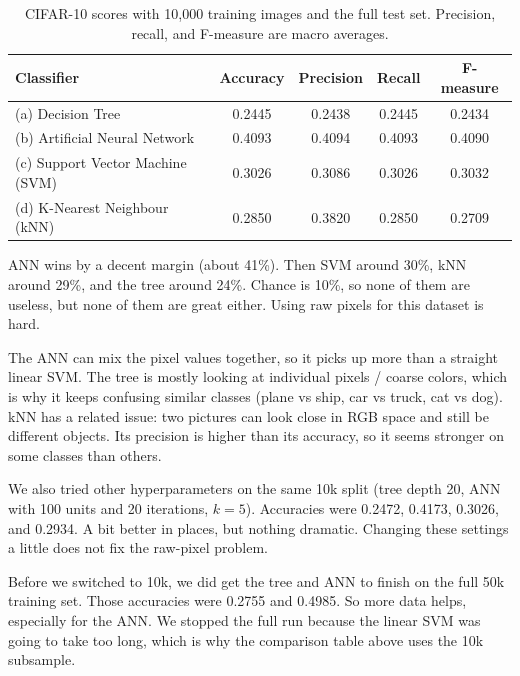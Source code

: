 \documentclass[11pt]{article}
\begin{document}
\begin{table}[h!]
\centering
\begin{tabular}{|l|c|c|c|c|}
\hline
\textbf{Classifier} & \textbf{Accuracy} & \textbf{Precision} & \textbf{Recall} & \textbf{F-measure} \tabularnewline \hline
(a) Decision Tree & 0.2445 & 0.2438 & 0.2445 & 0.2434 \tabularnewline \hline
(b) Artificial Neural Network & 0.4093 & 0.4094 & 0.4093 & 0.4090 \tabularnewline \hline
(c) Support Vector Machine (SVM) & 0.3026 & 0.3086 & 0.3026 & 0.3032 \tabularnewline \hline
(d) K-Nearest Neighbour (kNN) & 0.2850 & 0.3820 & 0.2850 & 0.2709 \tabularnewline \hline
\end{tabular}
\caption{CIFAR-10 scores with 10,000 training images and the full test set. Precision, recall, and F-measure are macro averages.}
\end{table}

ANN wins by a decent margin (about 41\%). Then SVM around 30\%, kNN around 29\%, and the tree around 24\%. Chance is 10\%, so none of them are useless, but none of them are great either. Using raw pixels for this dataset is hard.

The ANN can mix the pixel values together, so it picks up more than a straight linear SVM. The tree is mostly looking at individual pixels / coarse colors, which is why it keeps confusing similar classes (plane vs ship, car vs truck, cat vs dog). kNN has a related issue: two pictures can look close in RGB space and still be different objects. Its precision is higher than its accuracy, so it seems stronger on some classes than others.

We also tried other hyperparameters on the same 10k split (tree depth 20, ANN with 100 units and 20 iterations, $k=5$). Accuracies were 0.2472, 0.4173, 0.3026, and 0.2934. A bit better in places, but nothing dramatic. Changing these settings a little does not fix the raw-pixel problem.

Before we switched to 10k, we did get the tree and ANN to finish on the full 50k training set. Those accuracies were 0.2755 and 0.4985. So more data helps, especially for the ANN. We stopped the full run because the linear SVM was going to take too long, which is why the comparison table above uses the 10k subsample.
\end{document}
